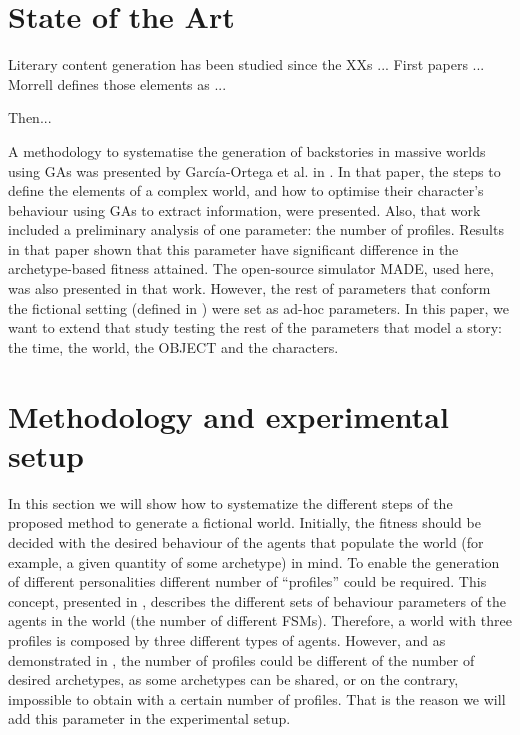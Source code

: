 \documentclass[runningheads,a4paper]{llncs}
\begin{document}
\section{State of the Art}
 

Literary content generation has been studied since the XXs ... First papers ...  Morrell \cite{MorrellFiction06} defines those elements as ...

Then...

A methodology to systematise the generation of backstories in massive worlds 
using GAs was presented by García-Ortega et al. in \cite{garcia14my}. In that
paper, the steps to define the elements of a complex world, and how to optimise 
their character's behaviour using GAs to extract information, were presented. 
Also, that work included a preliminary analysis of one parameter: the number of
profiles. Results in that paper shown that this parameter have significant 
difference in the archetype-based fitness attained. The open-source simulator 
MADE, used here, was also presented in that work. However, the rest of 
parameters that conform the fictional setting (defined in 
\cite{MorrellFiction06}) were set as ad-hoc parameters. In this paper, we want 
to extend that study testing the rest of the parameters that model a story: the
time, the world, the OBJECT and the characters.

\section{Methodology and experimental setup} %
\label{sec:met}

In this section we will show how to systematize the different steps
of the proposed method to generate a fictional world. Initially, the
fitness should be decided with the desired behaviour of the
agents that populate the world (for example, a given quantity of some
archetype) in mind. To enable the generation of different
personalities different number of ``profiles'' could be required. This concept,
presented in \cite{garcia14my}, describes the different sets of behaviour
parameters of the agents in the world (the number of different
FSMs). Therefore, a world with three profiles is composed by three different
types of agents. However, and as demonstrated in \cite{garcia14my}, the
number of profiles could be different of the number of desired
archetypes, as some archetypes can be shared, or on the contrary, impossible to obtain with a certain number of profiles.
That is the reason we will add this parameter in the experimental setup. %
\end{document}

